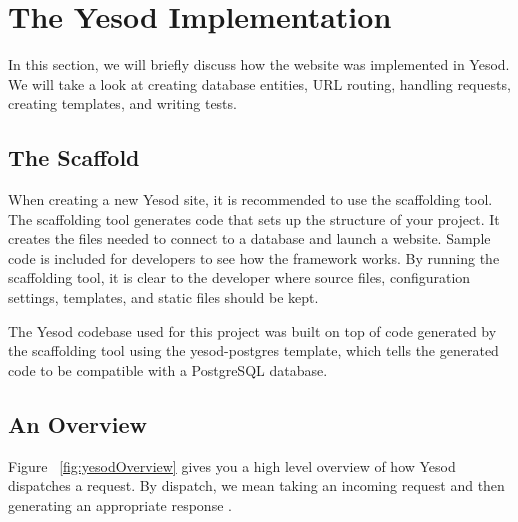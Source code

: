 \section{The Yesod Implementation}

In this section, we will briefly discuss how the website was implemented in Yesod.
We will take a look at creating database entities, URL routing, handling requests,
creating templates, and writing tests.

\subsection{The Scaffold}

When creating a new Yesod site, it is recommended to use the scaffolding tool.
The scaffolding tool generates code that sets up the structure of your project. It
creates the files needed to connect to a database and launch a website. Sample code
is included for developers to see how the framework works. By running the scaffolding
tool, it is clear to the developer where source files, configuration settings, templates, and 
static files should be kept. \parencite[Scaffolding and the Site Template]{yesodBook}

The Yesod codebase used for this project was built on top of code generated by the
scaffolding tool using the yesod-postgres template, which tells the generated code
to be compatible with a PostgreSQL database.

\subsection{An Overview}

Figure ~\ref{fig:yesodOverview} gives you a high level overview of how Yesod
dispatches a request. By dispatch, we mean taking an incoming request and
then generating an appropriate response \parencite[Understanding a Request]{yesodBook}.

